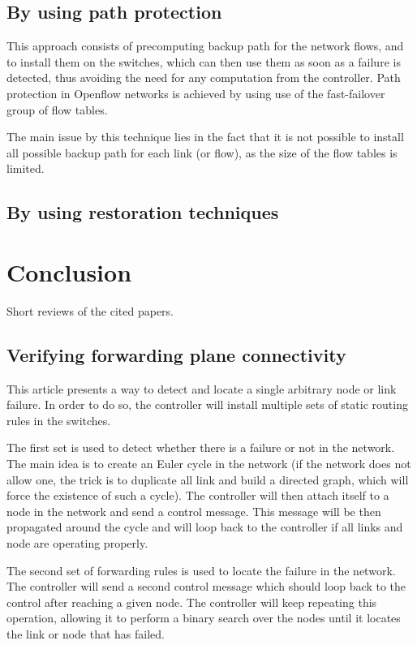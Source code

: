 \documentclass[compsoc]{IEEEtran}
\begin{document}
\subsection{By using path protection}
This approach consists of precomputing backup path for the network flows, and to install them on the switches, which can then use them as soon as a failure is detected, thus avoiding the need for any computation from the controller. Path protection in Openflow networks is achieved by using use of the fast-failover group of flow tables.

The main issue by this technique lies in the fact that it is not possible to install all possible backup path for each link (or flow), as the size of the flow tables is limited.

\subsection{By using restoration techniques}

\section{Conclusion}


\nocite{*}


\appendix
Short reviews of the cited papers.
\subsection{Verifying forwarding plane connectivity \cite{2013arXiv1308.4465K}}
This article presents a way to detect and locate a single arbitrary node or link failure.
In order to do so, the controller will install multiple sets of static routing rules in the switches.

The first set is used to detect whether there is a failure or not in the network.
The main idea is to create an Euler cycle in the network (if the network does not allow one, the trick is to duplicate all link and build a directed graph, which will force the existence of such a cycle). The controller will then attach itself to a node in the network and send a control message. This message will be then propagated around the cycle and will loop back to the controller if all links and node are operating properly.

The second set of forwarding rules is used to locate the failure in the network. The controller will send a second control message which should loop back to the control after reaching a given node. The controller will keep repeating this operation, allowing it to perform a binary search over the nodes until it locates the link or node that has failed.
\end{document}
